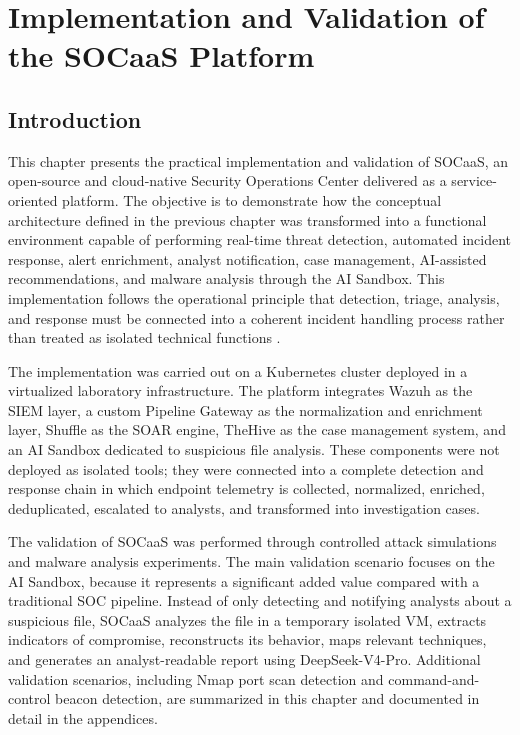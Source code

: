 \setcounter{chapter}{3}
\chapter{Implementation and Validation of the SOCaaS Platform}
\label{chap:socaas-implementation-validation}

\section{Introduction}
\label{sec:ch4-introduction}

This chapter presents the practical implementation and validation of SOCaaS, an open-source and cloud-native Security Operations Center delivered as a service-oriented platform. The objective is to demonstrate how the conceptual architecture defined in the previous chapter was transformed into a functional environment capable of performing real-time threat detection, automated incident response, alert enrichment, analyst notification, case management, AI-assisted recommendations, and malware analysis through the AI Sandbox. This implementation follows the operational principle that detection, triage, analysis, and response must be connected into a coherent incident handling process rather than treated as isolated technical functions \cite{bejtlich2013nsm,nist-sp800-61r2}.

The implementation was carried out on a Kubernetes cluster deployed in a virtualized laboratory infrastructure. The platform integrates Wazuh as the SIEM layer, a custom Pipeline Gateway as the normalization and enrichment layer, Shuffle as the SOAR engine, TheHive as the case management system, and an AI Sandbox dedicated to suspicious file analysis. These components were not deployed as isolated tools; they were connected into a complete detection and response chain in which endpoint telemetry is collected, normalized, enriched, deduplicated, escalated to analysts, and transformed into investigation cases.

The validation of SOCaaS was performed through controlled attack simulations and malware analysis experiments. The main validation scenario focuses on the AI Sandbox, because it represents a significant added value compared with a traditional SOC pipeline. Instead of only detecting and notifying analysts about a suspicious file, SOCaaS analyzes the file in a temporary isolated VM, extracts indicators of compromise, reconstructs its behavior, maps relevant techniques, and generates an analyst-readable report using DeepSeek-V4-Pro. Additional validation scenarios, including Nmap port scan detection and command-and-control beacon detection, are summarized in this chapter and documented in detail in the appendices.

